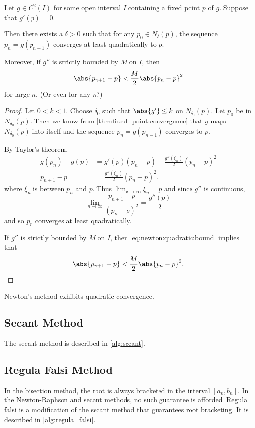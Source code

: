 \documentclass[12pt]{article}
\begin{document}
\begin{theorem} \label{thm:newton:quadratic}
    Let $g \in C^2(I)$ for some open interval $I$ containing a fixed point $p$
    of $g$.
    Suppose that $g'(p) = 0$.

    Then there exists a $\delta > 0$ such that for any $p_0 \in N_\delta(p)$,
    the sequence $p_n = g(p_{n-1})$ converges at least quadratically to $p$.

    Moreover, if $g''$ is strictly bounded by $M$ on $I$, then \[
        \abs{p_{n+1} - p} < \frac{M}{2} \abs{p_n - p}^2
    \] \textcolor{red!70}{for large $n$}. (Or even for any $n$?)
\end{theorem}
\begin{proof}
    Let $0 < k < 1$.
    Choose $\delta_0$ such that $\abs{g'} \leq k$ on $N_{\delta_0}(p)$.
    Let $p_0$ be in $N_{\delta_0}(p)$.
    Then we know from \cref{thm:fixed_point:convergence} that 
    $g$ maps $N_{\delta_0}(p)$ into itself and the sequence $p_n = g(p_{n-1})$
    converges to $p$.

    By Taylor's theorem,
    \begin{align*}
        g(p_n) - g(p) &= g'(p) (p_n - p) + \frac{g''(\xi_n)}{2} (p_n - p)^2\\
        p_{n+1}  -   p  &= \frac{g''(\xi_n)}{2} (p_n - p)^2. \tag{$*$}
            \label{eq:newton:quadratic:bound}
    \end{align*}
    where $\xi_n$ is between $p_n$ and $p$.
    Thus $\lim_{n \to \infty} \xi_n = p$ and since $g''$ is continuous, \[
        \lim_{n \to \infty} \frac{p_{n+1} - p}{(p_n - p)^2} = \frac{g''(p)}{2}
    \] and so $p_n$ converges at least quadratically.

    If $g''$ is strictly bounded by $M$ on $I$, then 
    \cref{eq:newton:quadratic:bound} implies that \[
        \abs{p_{n+1} - p} < \frac{M}{2} \abs{p_n - p}^2. \qedhere
    \]
\end{proof}
\begin{corollary} \label{thm:newton:rate}
    Newton's method exhibits quadratic convergence.
\end{corollary}

\subsection{Secant Method} \label{sec:secant}
The secant method is described in \cref{alg:secant}.
\subsection{Regula Falsi Method} \label{sec:regula_falsi}
In the bisection method, the root is always bracketed in the interval
$[a_n, b_n]$.
In the Newton-Raphson and secant methods, no such guarantee is afforded.
Regula falsi is a modification of the secant method that guarantees root
bracketing.
It is described in \cref{alg:regula_falsi}.
\end{document}
